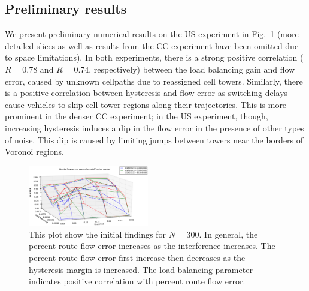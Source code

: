\subsection{Preliminary results}

We present preliminary numerical results on the US experiment in Fig.~\ref{fig:results1} (more detailed slices as well as results from the CC experiment have been omitted due to space limitations). In both experiments, there is a strong positive correlation ($R=0.78$ and $R=0.74$, respectively) between the load balancing gain and flow error, caused by unknown cellpaths due to reassigned cell towers. Similarly, there is a positive correlation between hysteresis and flow error as switching delays cause vehicles to skip cell tower regions along their trajectories.  This is more prominent in the denser CC experiment; in the US experiment, though, increasing hysteresis induces a dip in the flow error in the presence of other types of noise. This dip is caused by limiting jumps between towers near the borders of Voronoi regions. 

\begin{figure}[ht]
  \centering
    \includegraphics[width=0.47\textwidth]{figures/results_300_hysteresis.png}
  \caption{\footnotesize{This plot show the initial findings for $N=300$. In general, the percent route flow error increases as the interference increases. The percent route flow error first increase then decreases as the hysteresis margin is increased. The load balancing parameter indicates positive correlation with percent route flow error.}}
  \label{fig:results1}
\end{figure}

